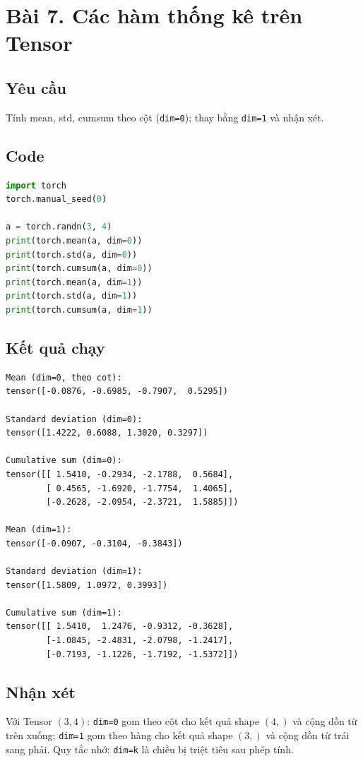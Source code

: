 \documentclass[a4paper,13pt]{article}
\begin{document}
\section{Bài 7. Các hàm thống kê trên Tensor}

\subsection{Yêu cầu}
Tính mean, std, cumsum theo cột (\texttt{dim=0}); thay bằng \texttt{dim=1} và nhận xét.

\subsection{Code}
\begin{lstlisting}[language=Python]
import torch
torch.manual_seed(0)

a = torch.randn(3, 4)
print(torch.mean(a, dim=0))
print(torch.std(a, dim=0))
print(torch.cumsum(a, dim=0))
print(torch.mean(a, dim=1))
print(torch.std(a, dim=1))
print(torch.cumsum(a, dim=1))
\end{lstlisting}

\subsection{Kết quả chạy}
\begin{lstlisting}[backgroundcolor=\color{outgray}]
Mean (dim=0, theo cot):
tensor([-0.0876, -0.6985, -0.7907,  0.5295])

Standard deviation (dim=0):
tensor([1.4222, 0.6088, 1.3020, 0.3297])

Cumulative sum (dim=0):
tensor([[ 1.5410, -0.2934, -2.1788,  0.5684],
        [ 0.4565, -1.6920, -1.7754,  1.4065],
        [-0.2628, -2.0954, -2.3721,  1.5885]])

Mean (dim=1):
tensor([-0.0907, -0.3104, -0.3843])

Standard deviation (dim=1):
tensor([1.5809, 1.0972, 0.3993])

Cumulative sum (dim=1):
tensor([[ 1.5410,  1.2476, -0.9312, -0.3628],
        [-1.0845, -2.4831, -2.0798, -1.2417],
        [-0.7193, -1.1226, -1.7192, -1.5372]])
\end{lstlisting}

\subsection{Nhận xét}
Với Tensor $(3,4)$: \texttt{dim=0} gom theo cột cho kết quả shape $(4,)$ và cộng dồn từ trên xuống; \texttt{dim=1} gom theo hàng cho kết quả shape $(3,)$ và cộng dồn từ trái sang phải. Quy tắc nhớ: \texttt{dim=k} là chiều bị triệt tiêu sau phép tính.
\end{document}
